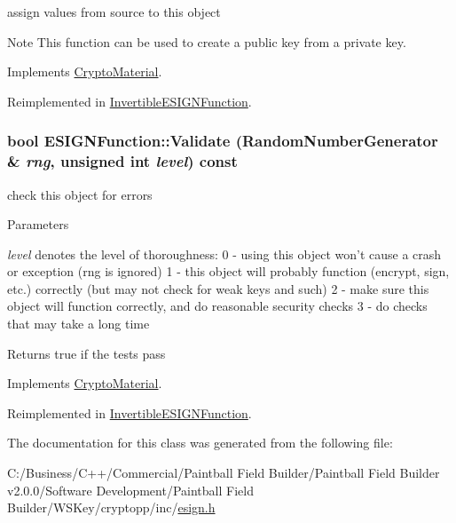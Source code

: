 assign values from source to this object \begin{DoxyNote}{Note}
This function can be used to create a public key from a private key. 
\end{DoxyNote}


Implements \hyperlink{class_crypto_material_a20181c1b39a74a9fe91385b025b773c6}{CryptoMaterial}.

Reimplemented in \hyperlink{class_invertible_e_s_i_g_n_function_aca870e350b30d04a47d452f21e903278}{InvertibleESIGNFunction}.\hypertarget{class_e_s_i_g_n_function_ad9696d3e060bd7acb702b5bfa650eeb7}{
\subsubsection[{Validate}]{\setlength{\rightskip}{0pt plus 5cm}bool ESIGNFunction::Validate ({\bf RandomNumberGenerator} \& {\em rng}, \/  unsigned int {\em level}) const}}
\label{class_e_s_i_g_n_function_ad9696d3e060bd7acb702b5bfa650eeb7}


check this object for errors 
\begin{DoxyParams}{Parameters}
\item[{\em level}]denotes the level of thoroughness: 0 -\/ using this object won't cause a crash or exception (rng is ignored) 1 -\/ this object will probably function (encrypt, sign, etc.) correctly (but may not check for weak keys and such) 2 -\/ make sure this object will function correctly, and do reasonable security checks 3 -\/ do checks that may take a long time \end{DoxyParams}
\begin{DoxyReturn}{Returns}
true if the tests pass 
\end{DoxyReturn}


Implements \hyperlink{class_crypto_material_aaa7d67d0c12712de0e33713c73f5b718}{CryptoMaterial}.

Reimplemented in \hyperlink{class_invertible_e_s_i_g_n_function_a7ff23978311f9f86024f8287d3fd02a8}{InvertibleESIGNFunction}.

The documentation for this class was generated from the following file:\begin{DoxyCompactItemize}
\item 
C:/Business/C++/Commercial/Paintball Field Builder/Paintball Field Builder v2.0.0/Software Development/Paintball Field Builder/WSKey/cryptopp/inc/\hyperlink{esign_8h}{esign.h}\end{DoxyCompactItemize}
